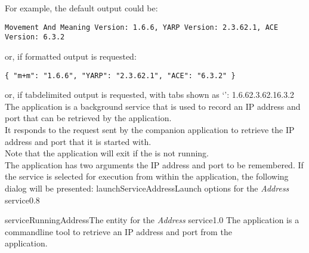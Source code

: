 \insertFullUtilityParameters{}
For example, the default output could be:
\outputBegin
\begin{verbatim}
Movement And Meaning Version: 1.6.6, YARP Version: 2.3.62.1, ACE Version: 6.3.2
\end{verbatim}
\outputEnd{}
or, if \json\longDash{}formatted output is requested:
\outputBegin
\begin{verbatim}
{ "m+m": "1.6.6", "YARP": "2.3.62.1", "ACE": "6.3.2" }
\end{verbatim}
\outputEnd{}
or, if tab\longDash{}delimited output is requested, with tabs shown as `\tabSymbol':
\outputBegin{}
1.6.6\pseudotab{}2.3.62.1\pseudotab{}6.3.2
\outputEnd
{}
\secondaryEnd
\condPage
{}
The  application is a background service that is used to
record an IP address and port that can be retrieved by the 
application.\\

It responds to the  request sent by the
companion application  to retrieve the IP address and port
that it is started with.\\

Note that the application will exit if the  is not
running.\\

The application has two arguments \longDash{} the IP address and port to be remembered.
\insertAutoAppParameters
{}
\condPage
If the service is selected for execution from within the \emph{\MMMU} application, the
following dialog will be presented:
%
{launchServiceAddress}{Launch options for the \emph{Address} service}{0.8}

%
{serviceRunningAddress}{The \emph{\MMMU} entity for the \emph{Address} service}{1.0}
\condPage
{}
The  application is a command\longDash{}line tool to
retrieve an IP address and port from the\\
 application.\\

